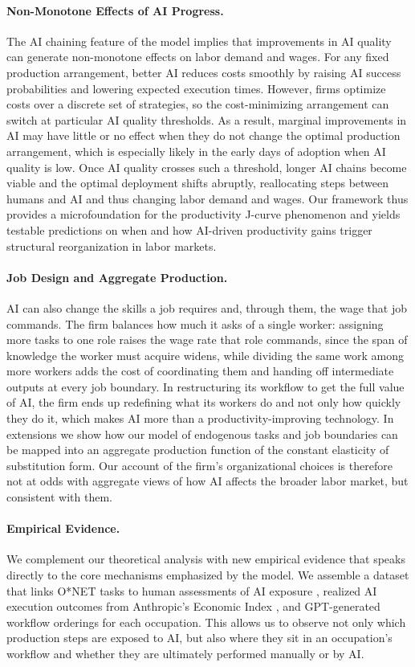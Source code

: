 \paragraph{Non-Monotone Effects of AI Progress.}
The AI chaining feature of the model implies that improvements in AI quality can generate non-monotone effects on labor demand and wages.
For any fixed production arrangement, better AI reduces costs smoothly by raising AI success probabilities and lowering expected execution times.
However, firms optimize costs over a discrete set of strategies, so the cost-minimizing arrangement can switch at particular AI quality thresholds.
As a result, marginal improvements in AI may have little or no effect when they do not change the optimal production arrangement, which is especially likely in the early days of adoption when AI quality is low.
Once AI quality crosses such a threshold, longer AI chains become viable and the optimal deployment shifts abruptly, reallocating steps between humans and AI and thus changing labor demand and wages.
Our framework thus provides a microfoundation for the productivity J-curve phenomenon \citep{brynjolfsson2021productivity} and yields testable predictions on when and how AI-driven productivity gains trigger structural reorganization in labor markets.


\paragraph{Job Design and Aggregate Production.}
AI can also change the skills a job requires and, through them, the wage that job commands.
The firm balances how much it asks of a single worker: assigning more tasks to one role raises the wage rate that role commands, since the span of knowledge the worker must acquire widens, while dividing the same work among more workers adds the cost of coordinating them and handing off intermediate outputs at every job boundary.
In restructuring its workflow to get the full value of AI, the firm ends up redefining what its workers do and not only how quickly they do it, which makes AI more than a productivity-improving technology.
In extensions we show how our model of endogenous tasks and job boundaries can be mapped into an aggregate production function of the constant elasticity of substitution form.
Our account of the firm's organizational choices is therefore not at odds with aggregate views of how AI affects the broader labor market, but consistent with them.


\paragraph{Empirical Evidence.}
We complement our theoretical analysis with new empirical evidence that speaks directly to the core mechanisms emphasized by the model.
We assemble a dataset that links O*NET tasks to human assessments of AI exposure \citep{eloundou2023gpts}, realized AI execution outcomes from Anthropic's Economic Index \citep{handa2025economictasksperformedai}, and GPT-generated workflow orderings for each occupation.
This allows us to observe not only which production steps are exposed to AI, but also where they sit in an occupation's workflow and whether they are ultimately performed manually or by AI.


